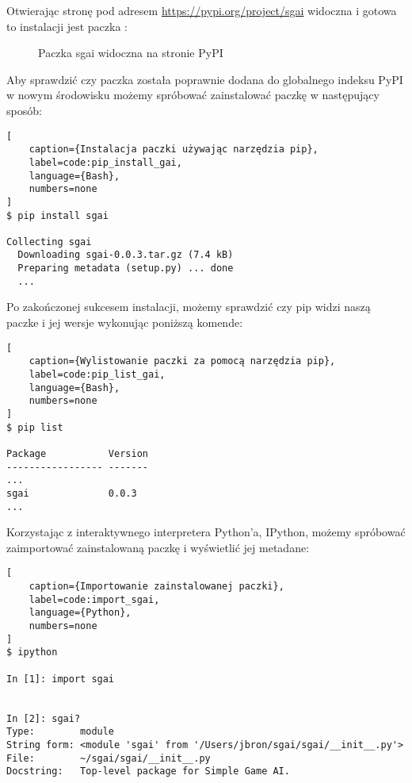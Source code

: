 \clearpage

Otwierając stronę pod adresem \url{https://pypi.org/project/sgai} widoczna i gotowa to instalacji jest paczka :

\begin{figure}[h]
    \centering
    \caption{Paczka sgai widoczna na stronie PyPI}
    \label{img:sgai_on_pypi}
\end{figure}

Aby sprawdzić czy paczka została poprawnie dodana do globalnego indeksu PyPI w nowym środowisku możemy spróbować zainstalować paczkę  w następujący sposób:

\begin{onepage}
    \begin{lstlisting}[
    caption={Instalacja paczki używając narzędzia pip},
    label=code:pip_install_gai,
    language={Bash},
    numbers=none
]
$ pip install sgai

Collecting sgai
  Downloading sgai-0.0.3.tar.gz (7.4 kB)
  Preparing metadata (setup.py) ... done
  ...
\end{lstlisting}
\end{onepage}

Po zakończonej sukcesem instalacji, możemy sprawdzić czy pip widzi naszą paczke i jej wersje wykonując poniższą komende:

\begin{onepage}
    \begin{lstlisting}[
    caption={Wylistowanie paczki za pomocą narzędzia pip},
    label=code:pip_list_gai,
    language={Bash},
    numbers=none
]
$ pip list

Package           Version
----------------- -------
...
sgai              0.0.3
...
\end{lstlisting}
\end{onepage}


\clearpage

Korzystając z interaktywnego interpretera Python'a, IPython, możemy spróbować zaimportować zainstalowaną paczkę i wyświetlić jej metadane:

\begin{onepage}
    \begin{lstlisting}[
    caption={Importowanie zainstalowanej paczki},
    label=code:import_sgai,
    language={Python},
    numbers=none
]
$ ipython

In [1]: import sgai


In [2]: sgai?
Type:        module
String form: <module 'sgai' from '/Users/jbron/sgai/sgai/__init__.py'>
File:        ~/sgai/sgai/__init__.py
Docstring:   Top-level package for Simple Game AI.

\end{lstlisting}
\end{onepage}

